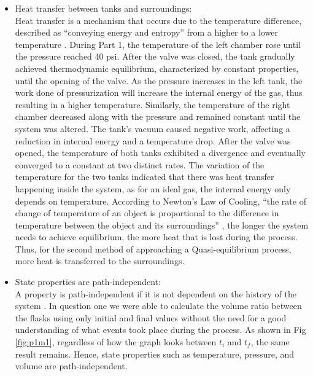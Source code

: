 \documentclass[12pt]{article}
\begin{document}
\begin{itemize}
    \item Heat transfer between tanks and surroundings: \\
    Heat transfer is a mechanism that occurs due to the temperature difference, described as “conveying energy and entropy” from a higher to a lower temperature \autocite{heat-transfer-britannica}. During Part 1, the temperature of the left chamber rose until the pressure reached 40 psi. After the valve was closed, the tank gradually achieved thermodynamic equilibrium, characterized by constant properties, until the opening of the valve. As the pressure increases in the left tank, the work done of pressurization will increase the internal energy of the gas, thus resulting in a higher temperature. Similarly, the temperature of the right chamber decreased along with the pressure and remained constant until the system was altered. The tank’s vacuum caused negative work, affecting a reduction in internal energy and a temperature drop.
    After the valve was opened, the temperature of both tanks exhibited a divergence and eventually converged to a constant at two distinct rates. The variation of the temperature for the two tanks indicated that there was heat transfer happening inside the system, as for an ideal gas, the internal energy only depends on temperature. According to Newton’s Law of Cooling, “the rate of change of temperature of an object is proportional to the difference in temperature between the object and its surroundings” \autocite{newton-law-of-cooling}, the longer the system needs to achieve equilibrium, the more heat that is lost during the process. Thus, for the second method of approaching a Quasi-equilibrium process, more heat is transferred to the surroundings.
    \item State properties are path-independent:\\
    A property is path-independent if it is not dependent on the history of the system \autocite{chandra2016energy}. In question one we were able to calculate the volume ratio between the flasks using only initial and final values without the need for a good understanding of what events took place during the process. As shown in Fig \ref{fig:p1m1}, regardless of how the graph looks between $t_i$ and $t_f$, the same result remains. Hence, state properties such as temperature, pressure, and volume are path-independent.
\end{itemize}
\end{document}
